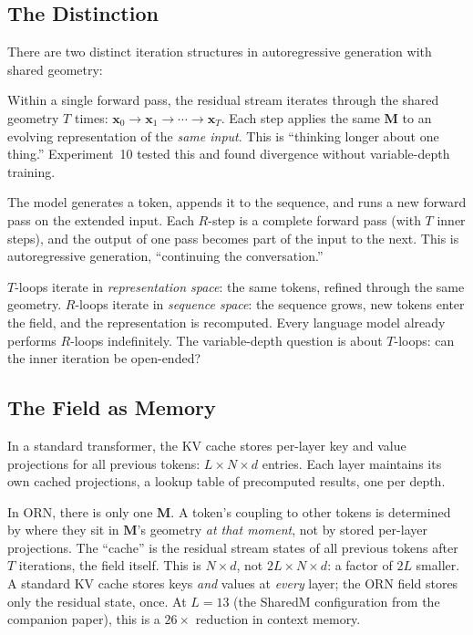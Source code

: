 \documentclass[11pt, a4paper]{article}
\newcommand{\M}{\mathbf{M}}
\newcommand{\x}{\mathbf{x}}
\theoremstyle{plain}
\theoremstyle{definition}
\theoremstyle{remark}
\begin{document}
\subsection{The Distinction}

There are two distinct iteration structures in autoregressive generation with shared geometry:

\begin{description}[nosep, leftmargin=1.5em]
    \item[$T$-loops (inner iteration).]
    Within a single forward pass, the residual stream iterates through the shared geometry $T$ times: $\x_0 \to \x_1 \to \cdots \to \x_T$.
    Each step applies the same $\M$ to an evolving representation of the \emph{same input}.
    This is ``thinking longer about one thing.''
    Experiment~10 tested this and found divergence without variable-depth training.

    \item[$R$-loops (outer iteration).]
    The model generates a token, appends it to the sequence, and runs a new forward pass on the extended input.
    Each $R$-step is a complete forward pass (with $T$ inner steps), and the output of one pass becomes part of the input to the next.
    This is autoregressive generation, ``continuing the conversation.''
\end{description}

$T$-loops iterate in \emph{representation space}: the same tokens, refined through the same geometry.
$R$-loops iterate in \emph{sequence space}: the sequence grows, new tokens enter the field, and the representation is recomputed.
Every language model already performs $R$-loops indefinitely.
The variable-depth question is about $T$-loops: can the inner iteration be open-ended?

\subsection{The Field as Memory}

In a standard transformer, the KV cache stores per-layer key and value projections for all previous tokens: $L \times N \times d$ entries.
Each layer maintains its own cached projections, a lookup table of precomputed results, one per depth.

In ORN, there is only one $\M$.
A token's coupling to other tokens is determined by where they sit in $\M$'s geometry \emph{at that moment}, not by stored per-layer projections.
The ``cache'' is the residual stream states of all previous tokens after $T$ iterations, the field itself.
This is $N \times d$, not $2L \times N \times d$: a factor of $2L$ smaller.
A standard KV cache stores keys \emph{and} values at \emph{every} layer; the ORN field stores only the residual state, once.
At $L{=}13$ (the SharedM configuration from the companion paper), this is a $26\times$ reduction in context memory.
\end{document}
